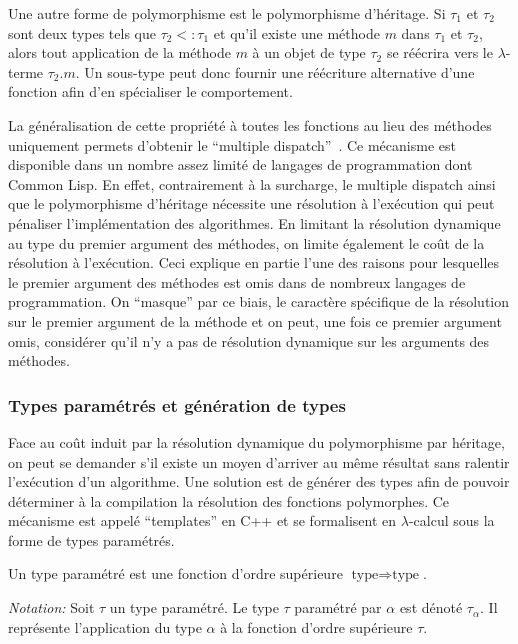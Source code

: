 Une autre forme de polymorphisme est le polymorphisme d'héritage. Si
$\tau_1$ et $\tau_2$ sont deux types tels que $\tau_2 <: \tau_1$ et
qu'il existe une méthode $m$ dans $\tau_1$ et $\tau_2$, alors tout
application de la méthode $m$ à un objet de type $\tau_2$ se réécrira
vers le $\lambda$-terme $\tau_2.m$. Un sous-type peut donc fournir une
réécriture alternative d'une fonction afin d'en spécialiser le
comportement.

La généralisation de cette propriété à toutes les fonctions au lieu
des méthodes uniquement permets d'obtenir le ``multiple
dispatch''~\citep{Muschevici2008}. Ce mécanisme est disponible dans
un nombre assez limité de langages de programmation dont Common
Lisp. En effet, contrairement à la surcharge, le multiple dispatch
ainsi que le polymorphisme d'héritage nécessite une résolution à
l'exécution qui peut pénaliser l'implémentation des algorithmes. En
limitant la résolution dynamique au type du premier argument des
méthodes, on limite également le coût de la résolution à
l'exécution. Ceci explique en partie l'une des raisons pour lesquelles
le premier argument des méthodes est omis dans de nombreux langages de
programmation. On ``masque'' par ce biais, le caractère spécifique de
la résolution sur le premier argument de la méthode et on peut, une
fois ce premier argument omis, considérer qu'il n'y a pas de
résolution dynamique sur les arguments des méthodes.


\subsubsection{Types paramétrés et génération de types}

Face au coût induit par la résolution dynamique du polymorphisme par
héritage, on peut se demander s'il existe un moyen d'arriver au même
résultat sans ralentir l'exécution d'un algorithme. Une solution est
de générer des types afin de pouvoir déterminer à la compilation la
résolution des fonctions polymorphes. Ce mécanisme est appelé
``templates'' en C++ et se formalisent en $\lambda$-calcul sous la
forme de types paramétrés.


\begin{mydef}\label{chap1_parametrized_type}
  Un type paramétré est une fonction d'ordre supérieure $\text{type}
  \Rightarrow \text{type}$.

  \emph{Notation:} Soit $\tau$ un type paramétré. Le type $\tau$
  paramétré par $\alpha$ est dénoté $\tau_\alpha$. Il représente
  l'application du type $\alpha$ à la fonction d'ordre supérieure
  $\tau$.
\end{mydef}


